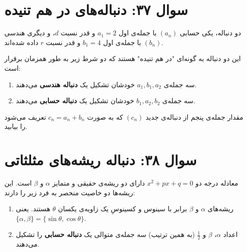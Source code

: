 \documentclass[12pt]{article}
\begin{document}
	\vspace{1cm}
	\hrulefill
	\vspace{1cm}
	
	\section*{سوال ۳۷: دنباله‌های در هم تنیده }
	دو دنباله، یکی حسابی \( (a_n) \) با جمله‌ی اول \(a_1 = 2\) و قدر نسبت \(d\)، و دیگری هندسی \( (b_n) \) با جمله‌ی اول \(b_1 = 4\) و قدر نسبت \(r\) داده شده‌اند.
	\vspace{0.5cm}
	
	این دو دنباله به گونه‌ای "در هم تنیده" هستند که دو شرط زیر به طور همزمان برقرار است:
	\begin{enumerate}[label=(\roman*)]
		\item سه جمله‌ی \(a_1, b_1, a_2\) خودشان تشکیل یک \textbf{دنباله هندسی} می‌دهند.
		\item سه جمله‌ی \(b_1, a_2, b_2\) خودشان تشکیل یک \textbf{دنباله حسابی} می‌دهند.
	\end{enumerate}
	\vspace{0.5cm}
	
	مقدار جمله‌ی پنجم از دنباله‌ی جدید \( (c_n) \) که به صورت \(c_n = a_n + b_n\) تعریف می‌شود را بیابید.
	
	\vspace{1cm}
	\hrulefill
	\vspace{1cm}
	
	
	\section*{سوال ۳۸: دنباله ریشه‌های مثلثاتی}
	معادله درجه دو \( x^2 + px + q = 0 \) دارای دو ریشه‌ی حقیقی و متمایز \(\alpha\) و \(\beta\) است. این ریشه‌ها دو خاصیت منحصر به فرد زیر را دارند:
	\begin{enumerate}[label=(\roman*)]
		\item ریشه‌های \(\alpha\) و \(\beta\) برابر با سینوس و کسینوسِ یک زاویه‌ی یکسان \(\theta\) هستند. یعنی \( \{\alpha, \beta\} = \{\sin\theta, \cos\theta\} \).
		\item اعداد \(\alpha\)، \(\beta\) و \(\frac{1}{2}\) (به همین ترتیب) سه جمله‌ی متوالی یک \textbf{دنباله حسابی} را تشکیل می‌دهند.
	\end{enumerate}
	\vspace{0.5cm}
	
\end{document}
